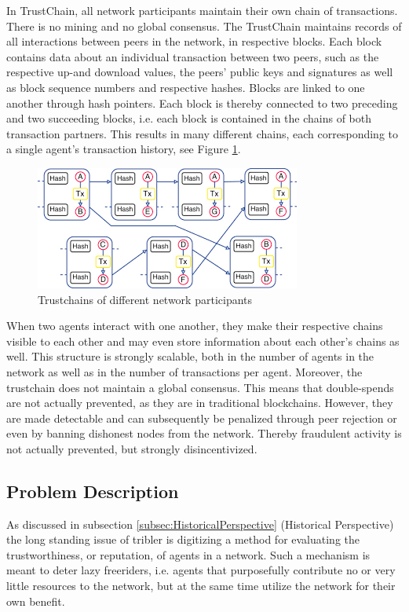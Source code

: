 \documentclass[twocolumn]{article}
\theoremstyle{definition}
\theoremstyle{theorem}
\begin{document}
\noindent{} In TrustChain, all network participants maintain their own chain of transactions. There is no mining and no global consensus. The TrustChain maintains records of all interactions between peers in the network, in respective blocks. Each block contains data about an individual transaction between two peers, such as the respective up-and download values, the peers' public keys and signatures as well as block sequence numbers and respective hashes. Blocks are linked to one another through hash pointers. Each block is thereby connected to two preceding and two succeeding blocks, i.e. each block is contained in the chains of both transaction partners. This results in many different chains, each corresponding to a single agent's transaction history, see Figure \ref{fig:Trustchain}\cite{TrustChain: A Sybil-resistant scalable blockchain}. \vspace{1em}\\

\begin{figure}
\includegraphics[scale=0.6]{Trustchain}
\caption{Trustchains of different network participants}
\label{fig:Trustchain}
\end{figure} 

\noindent When two agents interact with one another, they make their respective chains visible to each other and may even store information about each other's chains as well. This structure is strongly scalable, both in the number of agents in the network as well as in the number of transactions per agent. Moreover, the trustchain does not maintain a global consensus. This means that double-spends are not actually prevented, as they are in traditional blockchains. However, they are made detectable and can subsequently be penalized through peer rejection or even by banning dishonest nodes from the network. Thereby fraudulent activity is not actually prevented, but strongly disincentivized.

\subsection{Problem Description}
\label{subsec:ProblemDescription}
As discussed in subsection \ref{subsec:HistoricalPerspective} (Historical Perspective) the long standing issue of tribler is digitizing a method for evaluating the trustworthiness, or reputation, of agents in a network. Such a mechanism is meant to deter lazy freeriders, i.e. agents that purposefully contribute no or very little resources to the network, but at the same time utilize the network for their own benefit. \vspace{1em}\\
\end{document}
